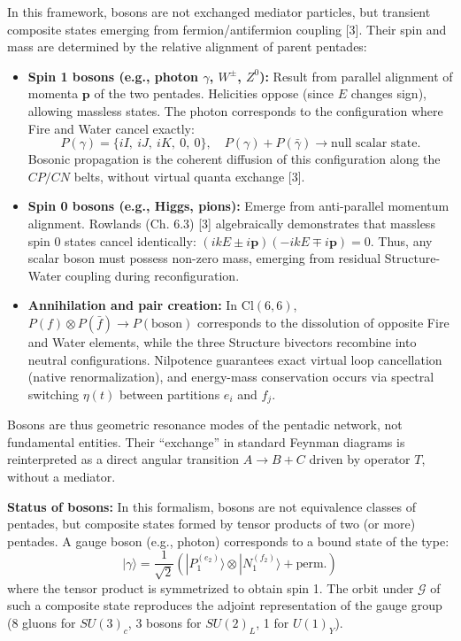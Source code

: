 \documentclass[11pt]{article}
\providecommand{\tightlist}{\setlength{\itemsep}{2pt}\setlength{\parskip}{6pt}}
\let\oldmathcal\mathcal
\renewcommand{\mathcal}[1]{\oldmathcal{#1}}
\providecommand{\tightlist}{%
  \setlength{\itemsep}{2pt}\setlength{\parskip}{6pt}
}
\begin{document}
In this framework, bosons are not exchanged mediator particles, but
transient composite states emerging from fermion/antifermion coupling
{[}3{]}. Their spin and mass are determined by the relative alignment of
parent pentades:

\begin{itemize}
\tightlist
\item
  \textbf{Spin 1 bosons (e.g., photon \(\gamma\), \(W^\pm\), \(Z^0\)):}
  Result from parallel alignment of momenta \(\mathbf{p}\) of the two
  pentades. Helicities oppose (since \(E\) changes sign), allowing
  massless states. The photon corresponds to the configuration where
  Fire and Water cancel exactly:
  \[P(\gamma) = \{iI,\ iJ,\ iK,\ 0,\ 0\}, \quad P(\gamma) + P(\bar{\gamma}) \to \text{null scalar state}.\]
  Bosonic propagation is the coherent diffusion of this configuration
  along the \(CP/CN\) belts, without virtual quanta exchange {[}3{]}.
\item
  \textbf{Spin 0 bosons (e.g., Higgs, pions):} Emerge from anti-parallel
  momentum alignment. Rowlands (Ch. 6.3) {[}3{]} algebraically
  demonstrates that massless spin 0 states cancel identically:
  \((ikE \pm i\mathbf{p})(-ikE \mp i\mathbf{p}) = 0\). Thus, any scalar
  boson must possess non-zero mass, emerging from residual
  Structure-Water coupling during reconfiguration.
\item
  \textbf{Annihilation and pair creation:} In \(\text{Cl}(6,6)\),
  \(P(f) \otimes P(\bar{f}) \to P(\text{boson})\) corresponds to the
  dissolution of opposite Fire and Water elements, while the three
  Structure bivectors recombine into neutral configurations. Nilpotence
  guarantees exact virtual loop cancellation (native renormalization),
  and energy-mass conservation occurs via spectral switching \(\eta(t)\)
  between partitions \(e_i\) and \(f_j\).
\end{itemize}

Bosons are thus geometric resonance modes of the pentadic network, not
fundamental entities. Their ``exchange'' in standard Feynman diagrams is
reinterpreted as a direct angular transition \(A \to B + C\) driven by
operator \(T\), without a mediator.

\textbf{Status of bosons:} In this formalism, bosons are not equivalence
classes of pentades, but composite states formed by tensor products of
two (or more) pentades. A gauge boson (e.g., photon) corresponds to a
bound state of the type:
\[|\gamma\rangle = \frac{1}{\sqrt{2}} \left( |P_1^{(e_2)}\rangle \otimes |N_1^{(f_2)}\rangle + \text{perm.} \right)\]
where the tensor product is symmetrized to obtain spin 1. The orbit
under \(\mathcal{G}\) of such a composite state reproduces the adjoint
representation of the gauge group (8 gluons for \(SU(3)_c\), 3 bosons
for \(SU(2)_L\), 1 for \(U(1)_Y\)).
\end{document}
